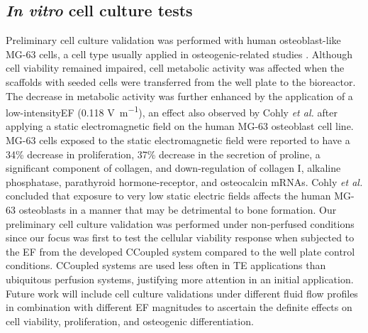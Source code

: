 \subsection{\textit{In vitro} cell culture tests}
Preliminary cell culture validation was performed with human osteoblast-like MG-63 cells, a cell type usually applied in osteogenic-related studies \cite{Ghanbari2023-du, Dehkordi2022-ku}. Although cell viability remained impaired, cell metabolic activity was affected when the scaffolds with seeded cells were transferred from the well plate to the bioreactor. The decrease in metabolic activity was further enhanced by the application of a low-intensity\acs{EF} (0.118 \unit{\volt\per\meter}), an effect also observed by Cohly \textit{et al.} \cite{Cohly2003-hm} after applying a static electromagnetic field on the human MG-63 osteoblast cell line. MG-63 cells exposed to the static electromagnetic field \cite{Cohly2003-hm} were reported to have a 34\% decrease in proliferation, 37\% decrease in the secretion of proline, a significant component of collagen, and down-regulation of collagen I, alkaline phosphatase, parathyroid hormone-receptor, and osteocalcin mRNAs. Cohly \textit{et al.} \cite{Cohly2003-hm} concluded that exposure to very low static electric fields affects the human MG-63 osteoblasts in a manner that may be detrimental to bone formation. Our preliminary cell culture validation was performed under non-perfused conditions since our focus was first to test the cellular viability response when subjected to the \acs{EF} from the developed \acs{CCoupled} system compared to the well plate control conditions. \acs{CCoupled} systems are used less often in \acs{TE} applications than ubiquitous perfusion systems, justifying more attention in an initial application. Future work will include cell culture validations under different fluid flow profiles in combination with different \acs{EF} magnitudes to ascertain the definite effects on cell viability, proliferation, and osteogenic differentiation.    


